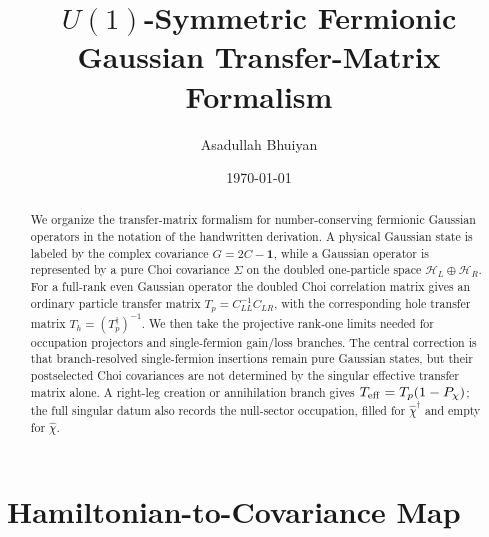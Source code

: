 \documentclass[aps,prb,onecolumn,nofootinbib,superscriptaddress]{revtex4-2}
\newcommand{\I}{\mathbf{1}}
\newcommand{\cH}{\mathcal{H}}
\theoremstyle{plain}
\theoremstyle{definition}
\begin{document}
\title{\texorpdfstring{\(U(1)\)}{U(1)}-Symmetric Fermionic Gaussian Transfer-Matrix Formalism}
\author{Asadullah Bhuiyan}
\date{\today}

\begin{abstract}
We organize the transfer-matrix formalism for number-conserving fermionic
Gaussian operators in the notation of the handwritten derivation.  A physical
Gaussian state is labeled by the complex covariance
\(G=2C-\I\), while a Gaussian operator is represented by a pure Choi covariance
\(\Sigma\) on the doubled one-particle space
\(\cH_L\oplus\cH_R\).  For a full-rank even Gaussian operator the doubled Choi
correlation matrix gives an ordinary particle transfer matrix
\(T_p=C_{LL}^{-1}C_{LR}\), with the corresponding hole transfer matrix
\(T_h=(T_p^\dagger)^{-1}\).  We then take the projective rank-one limits
needed for occupation projectors and single-fermion gain/loss branches.  The
central correction is that branch-resolved single-fermion insertions remain
pure Gaussian states, but their postselected Choi covariances are not
determined by the singular effective transfer matrix alone.  A right-leg
creation or annihilation branch gives \(T_{\rm eff}=T_p(1-P_\chi)\); the full
singular datum also records the null-sector occupation, filled for
\(\hat\chi^\dagger\) and empty for \(\hat\chi\).
\end{abstract}

\maketitle
\setcounter{tocdepth}{2}
\tableofcontents

\section{Hamiltonian-to-Covariance Map}
\end{document}

